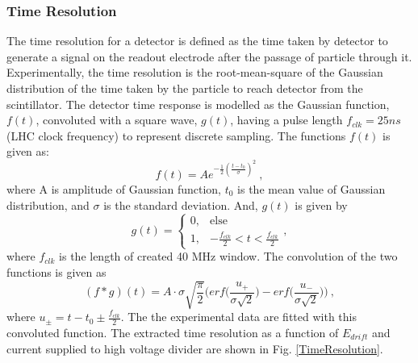 \subsubsection{Time Resolution}
The time resolution for a detector is defined as the time taken by detector to generate a signal on the readout electrode after the passage of particle through it.
Experimentally, the time resolution is the root-mean-square of the Gaussian distribution of the time taken by the particle to reach detector from the scintillator.
The detector time response is modelled as the Gaussian function, $f(t)$, convoluted with a square wave, $g(t)$, having a pulse length $f_{clk}=25ns$ (LHC clock frequency) to represent discrete sampling. 
The functions $f(t)$ is given as:
\begin{equation}
f(t) = Ae^{-\frac{1}{2}(\frac{t-t_0}{\sigma})^2}~,
\end{equation}
where A is amplitude of Gaussian function, $t_0$  is the mean value of Gaussian distribution, and $\sigma$ is the standard deviation. And, $g(t)$ is given by
\begin{equation}
g(t) =
      \begin{cases}
              0, & \text{else} \\
              1, & \text{$-\frac{f_{clk}}{2}<t<\frac{f_{clk}}{2}$}
      \end{cases},
\end{equation}
where $f_{clk}$ is the length of created 40 MHz window.
The convolution of the two functions is given as
\begin{equation}
(f*g)(t) = A \cdot \sigma \sqrt{\frac{\pi}{2}}\Big(erf\Big(\frac{u_{+}}{\sigma\sqrt{2}}\Big)-erf\Big(\frac{u_{-}}{\sigma\sqrt{2}}\Big)\Big)~,
\end{equation}
where $u_{\pm}= t-t_0\pm\frac{f_{clk}}{2}$. 
The the experimental data are fitted with this convoluted function.
The extracted time resolution as a function of $E_{drift}$ and current supplied to high voltage divider are shown in Fig. \ref{TimeResolution}. 

